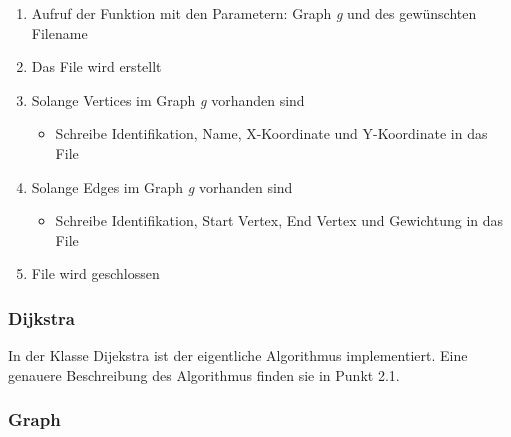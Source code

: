 \documentclass[a4paper,titlepage]{article}
\begin{document}
\begin{enumerate}
\item Aufruf der Funktion mit den Parametern: Graph \emph{g} und des gewünschten Filename
\item Das File wird erstellt
\item Solange Vertices im Graph \emph{g} vorhanden sind
\begin{itemize}\item Schreibe Identifikation, Name, X-Koordinate und Y-Koordinate in das File\end{itemize}
\item Solange Edges im Graph \emph{g} vorhanden sind
\begin{itemize}\item Schreibe Identifikation, Start Vertex, End Vertex und Gewichtung in das File\end{itemize}
\item File wird geschlossen
\end{enumerate}

\subsubsection{Dijkstra}

In der Klasse Dijekstra ist der eigentliche Algorithmus implementiert. Eine genauere Beschreibung des Algorithmus finden sie in Punkt 2.1.

\subsubsection{Graph}
\end{document}
